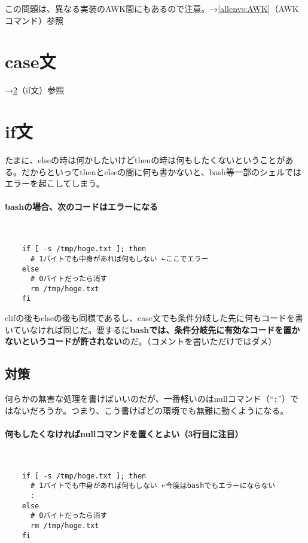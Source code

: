 この問題は、異なる実装のAWK間にもあるので注意。→\ref{allenvs:AWK}（AWKコマンド）参照

\section{case文}

\noindent
→\ref{allenvs:if}（if文）参照

\section{if文}
\label{allenvs:if}

たまに、elseの時は何かしたいけどthenの時は何もしたくないということがある。だからといってthenとelseの間に何も書かないと、bash等一部のシェルではエラーを起こしてしまう。

\paragraph{bashの場合、次のコードはエラーになる} 　\\
\begin{frameboxit}{160.0mm}
\begin{verbatim}
	if [ -s /tmp/hoge.txt ]; then
	  # 1バイトでも中身があれば何もしない ←ここでエラー
	else
	  # 0バイトだったら消す
	  rm /tmp/hoge.txt
	fi
\end{verbatim}
\end{frameboxit}

elifの後もelseの後も同様であるし、case文でも条件分岐した先に何もコードを書いていなければ同じだ。要するに\textbf{bashでは、条件分岐先に有効なコードを置かないというコードが許されない}のだ。（コメントを書いただけではダメ）

\subsection*{対策}

何らかの無害な処理を書けばいいのだが、一番軽いのはnullコマンド（``\verb|:|''）ではないだろうか。つまり、こう書けばどの環境でも無難に動くようになる。

\paragraph{何もしたくなければnullコマンドを置くとよい（3行目に注目）} 　\\
\begin{frameboxit}{160.0mm}
\begin{verbatim}
	if [ -s /tmp/hoge.txt ]; then
	  # 1バイトでも中身があれば何もしない ←今度はbashでもエラーにならない
	  :
	else
	  # 0バイトだったら消す
	  rm /tmp/hoge.txt
	fi
\end{verbatim}
\end{frameboxit}


